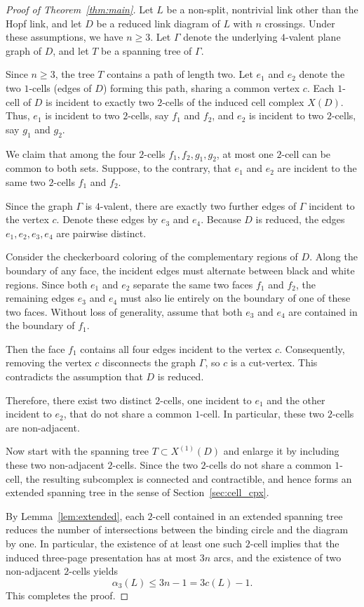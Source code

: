 \documentclass[11pt,a4paper]{amsart}
\begin{document}
\begin{proof}[Proof of Theorem~\ref{thm:main}]
Let $L$ be a non-split, nontrivial link other than the Hopf link,
and let $D$ be a reduced link diagram of $L$ with $n$ crossings.
Under these assumptions, we have $n\ge 3$.
Let $\Gamma$ denote the underlying $4$-valent plane graph of $D$,
and let $T$ be a spanning tree of $\Gamma$.

Since $n\ge 3$, the tree $T$ contains a path of length two.
Let $e_1$ and $e_2$ denote the two $1$-cells (edges of $D$)
forming this path, sharing a common vertex $c$.
Each $1$-cell of $D$ is incident to exactly two $2$-cells of the induced
cell complex $X(D)$.
Thus, $e_1$ is incident to two $2$-cells, say $f_1$ and $f_2$,
and $e_2$ is incident to two $2$-cells, say $g_1$ and $g_2$.

We claim that among the four $2$-cells $f_1,f_2,g_1,g_2$,
at most one $2$-cell can be common to both sets.
Suppose, to the contrary, that $e_1$ and $e_2$ are incident to the same
two $2$-cells $f_1$ and $f_2$.

Since the graph $\Gamma$ is $4$-valent, there are exactly two further edges
of $\Gamma$ incident to the vertex $c$.
Denote these edges by $e_3$ and $e_4$.
Because $D$ is reduced, the edges $e_1,e_2,e_3,e_4$ are pairwise distinct.

Consider the checkerboard coloring of the complementary regions of $D$.
Along the boundary of any face, the incident edges must alternate
between black and white regions.
Since both $e_1$ and $e_2$ separate the same two faces $f_1$ and $f_2$,
the remaining edges $e_3$ and $e_4$ must also lie entirely on the boundary
of one of these two faces.
Without loss of generality, assume that both $e_3$ and $e_4$ are contained
in the boundary of $f_1$.

Then the face $f_1$ contains all four edges incident to the vertex $c$.
Consequently, removing the vertex $c$ disconnects the graph $\Gamma$,
so $c$ is a cut-vertex.
This contradicts the assumption that $D$ is reduced.

Therefore, there exist two distinct $2$-cells,
one incident to $e_1$ and the other incident to $e_2$,
that do not share a common $1$-cell.
In particular, these two $2$-cells are non-adjacent.

Now start with the spanning tree $T\subset X^{(1)}(D)$
and enlarge it by including these two non-adjacent $2$-cells.
Since the two $2$-cells do not share a common $1$-cell,
the resulting subcomplex is connected and contractible,
and hence forms an extended spanning tree in the sense of
Section~\ref{sec:cell_cpx}.

By Lemma~\ref{lem:extended}, each $2$-cell contained in an extended
spanning tree reduces the number of intersections between the binding
circle and the diagram by one.
In particular, the existence of at least one such $2$-cell implies that
the induced three-page presentation has at most $3n$ arcs,
and the existence of two non-adjacent $2$-cells yields
$$
\alpha_3(L)\le 3n-1 = 3c(L)-1.
$$
This completes the proof.
\end{proof}
\end{document}
